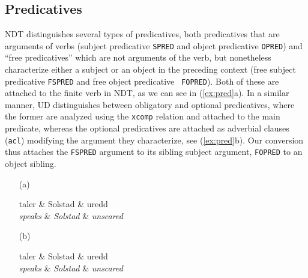 \documentclass[11pt,a4paper]{article}
\let\w=\emph
\begin{document}
\subsection{Predicatives}
NDT distinguishes several types of predicatives, both predicatives
that are arguments of verbs (subject predicative {\tt SPRED} and
object predicative {\tt OPRED}) and ``free predicatives'' which are
not arguments of the verb, but nonetheless characterize either a
subject or an object in the preceding context (free subject
predicative {\tt FSPRED} and free object predicative {\tt
  FOPRED}). Both of these are attached to the finite verb in NDT, as we can see in (\ref{ex:pred}a). In a
similar manner, UD distinguishes between obligatory and optional
predicatives, where the former are analyzed using the {\tt xcomp}
relation and attached to the main predicate, whereas the optional
predicatives are attached as adverbial clauses ({\tt acl}) modifying the argument
they characterize, see (\ref{ex:pred}b). Our conversion thus attaches the {\tt FSPRED} argument to its sibling subject argument, {\tt FOPRED} to an object sibling.
\begin{examples}
\item\label{ex:pred}
\begin{itemize}
\item[(a)]
    \begin{dependency}[arc edge, text only label, theme=simple]
        \begin{deptext}[column sep=.2cm]
          taler \& Solstad \& uredd \\
          \w{speaks} \& \w{Solstad} \& \w{unscared} \\
        \end{deptext}
    \end{dependency}
\item[(b)]
    \begin{dependency}[arc edge, text only label, theme=simple]
        \begin{deptext}[column sep=.2cm]
          taler \& Solstad \& uredd \\
          \w{speaks} \& \w{Solstad} \& \w{unscared} \\
        \end{deptext}
    \end{dependency}
\end{itemize}
\end{examples}
\end{document}
